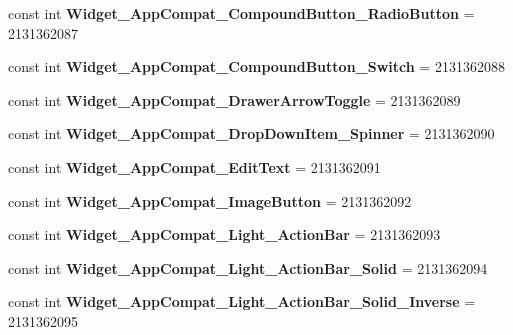 \begin{DoxyCompactItemize}
const int {\bfseries Widget\+\_\+\+App\+Compat\+\_\+\+Compound\+Button\+\_\+\+Radio\+Button} = 2131362087
\item 
\mbox{\label{classXaria_1_1Resource_1_1Style_ad186968f105a52884293b691e93aa5ea}} 
const int {\bfseries Widget\+\_\+\+App\+Compat\+\_\+\+Compound\+Button\+\_\+\+Switch} = 2131362088
\item 
\mbox{\label{classXaria_1_1Resource_1_1Style_ac41f5e6efecd70b05a47c7c244cdc905}} 
const int {\bfseries Widget\+\_\+\+App\+Compat\+\_\+\+Drawer\+Arrow\+Toggle} = 2131362089
\item 
\mbox{\label{classXaria_1_1Resource_1_1Style_a1d4b11af3dc7584eeb7a025e01e96119}} 
const int {\bfseries Widget\+\_\+\+App\+Compat\+\_\+\+Drop\+Down\+Item\+\_\+\+Spinner} = 2131362090
\item 
\mbox{\label{classXaria_1_1Resource_1_1Style_a9a7e7d40f1b8165a764a49fe50653617}} 
const int {\bfseries Widget\+\_\+\+App\+Compat\+\_\+\+Edit\+Text} = 2131362091
\item 
\mbox{\label{classXaria_1_1Resource_1_1Style_abcbb28f11e63ea26aa602e1e27164d75}} 
const int {\bfseries Widget\+\_\+\+App\+Compat\+\_\+\+Image\+Button} = 2131362092
\item 
\mbox{\label{classXaria_1_1Resource_1_1Style_ae0d0eb6ca4afdd4320be89a56cd6ff5f}} 
const int {\bfseries Widget\+\_\+\+App\+Compat\+\_\+\+Light\+\_\+\+Action\+Bar} = 2131362093
\item 
\mbox{\label{classXaria_1_1Resource_1_1Style_aa71f0916093051125d9e8c37319704e9}} 
const int {\bfseries Widget\+\_\+\+App\+Compat\+\_\+\+Light\+\_\+\+Action\+Bar\+\_\+\+Solid} = 2131362094
\item 
\mbox{\label{classXaria_1_1Resource_1_1Style_a986c0ee0ad34e6e056d6c8eea81fc677}} 
const int {\bfseries Widget\+\_\+\+App\+Compat\+\_\+\+Light\+\_\+\+Action\+Bar\+\_\+\+Solid\+\_\+\+Inverse} = 2131362095
\item 
\mbox{\label{classXaria_1_1Resource_1_1Style_a705845b4f4eaf2e83d60c981c3339a44}} 

\end{DoxyCompactItemize}
